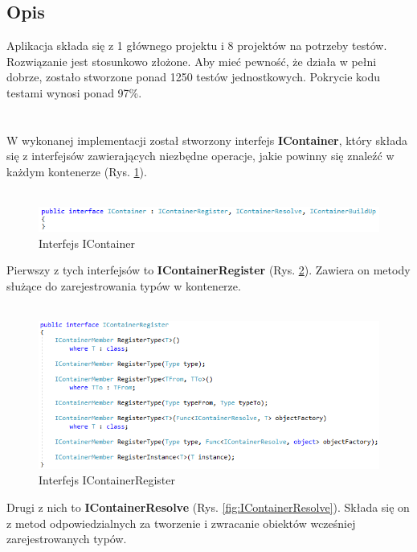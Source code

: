 \documentclass[12pt]{article}
\begin{document}
\subsection{Opis}
Aplikacja składa się z 1 głównego projektu i 8 projektów na potrzeby testów. Rozwiązanie jest stosunkowo złożone. Aby mieć pewność, że działa w pełni dobrze, zostało stworzone ponad 1250 testów jednostkowych. Pokrycie kodu testami wynosi ponad 97\%.\\
\\
\\
W wykonanej implementacji został stworzony interfejs \textbf{IContainer}, który składa się z interfejsów zawierających niezbędne operacje, jakie powinny się znaleźć w każdym kontenerze (Rys. \ref{fig:IContainer}).\\ \\
\begin{figure}[H]
	\begin{center}
  		\includegraphics{IContainer.png}
  		\caption{Interfejs IContainer}
  		\label{fig:IContainer}
	\end{center}
\end{figure}
Pierwszy z tych interfejsów to \textbf{IContainerRegister} (Rys. \ref{fig:IContainerRegister}). Zawiera on metody służące do zarejestrowania typów w kontenerze.\\ \\
\begin{figure}[H]
	\begin{center}
  		\includegraphics{IContainerRegister.png}
  		\caption{Interfejs IContainerRegister}
  		\label{fig:IContainerRegister}
	\end{center}
\end{figure}
Drugi z nich to \textbf{IContainerResolve} (Rys. \ref{fig:IContainerResolve}). Składa się on z metod odpowiedzialnych za tworzenie i zwracanie obiektów wcześniej zarejestrowanych typów.\\ \\
\end{document}
